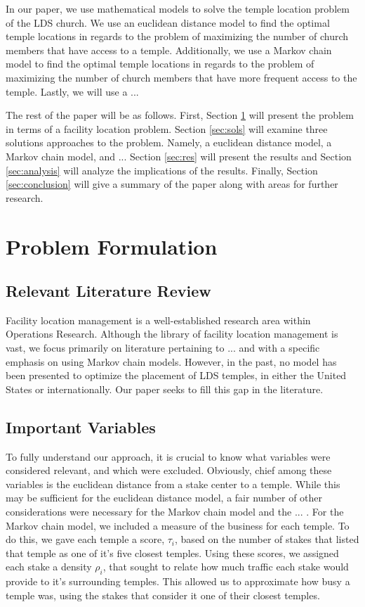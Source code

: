 \documentclass[twoside,twocolumn]{article}
\begin{document}
In our paper, we use mathematical models to solve the temple location problem of the LDS church. 
We use an euclidean distance model to find the optimal temple locations in regards to the problem of maximizing the number of church members that have access to a temple. 
Additionally, we use a Markov chain model to find the optimal temple locations in regards to the problem of maximizing the number of church members that have more frequent access to the temple. 
Lastly, we will use a ... %

The rest of the paper will be as follows.
First, Section \ref{sec:prob} will present the problem in terms of a facility location problem.
Section \ref{sec:sols} will examine three solutions approaches to the problem.
Namely, a euclidean distance model, a Markov chain model, and ... %
Section \ref{sec:res} will present the results and Section \ref{sec:analysis} will analyze the implications of the results.
Finally, Section \ref{sec:conclusion} will give a summary of the paper along with areas for further research.

\section{Problem Formulation}
\label{sec:prob}
\subsection{Relevant Literature Review}
Facility location management is a well-established research area within Operations Research. Although the library of facility location management is vast, we focus primarily on literature pertaining to ... and with a specific emphasis on using Markov chain models. However, in the past, no model has been presented to optimize the placement of LDS temples, in either the United States or internationally. Our paper seeks to fill this gap in the literature.
\subsection{Important Variables}
To fully understand our approach, it is crucial to know what variables were considered relevant, and which were excluded.
Obviously, chief among these variables is the euclidean distance from a stake center to a temple.
While this may be sufficient for the euclidean distance model, a fair number of other considerations were necessary for the Markov chain model and the ... .
For the Markov chain model, we included a measure of the business for each temple.
To do this, we gave each temple a score, $\tau_{i}$, based on the number of stakes that listed that temple as one of it's five closest temples.
Using these scores, we assigned each stake a density $\rho_{i}$, that sought to relate how much traffic each stake would provide to it's surrounding temples.
This allowed us to approximate how busy a temple was, using the stakes that consider it one of their closest temples.
\end{document}
